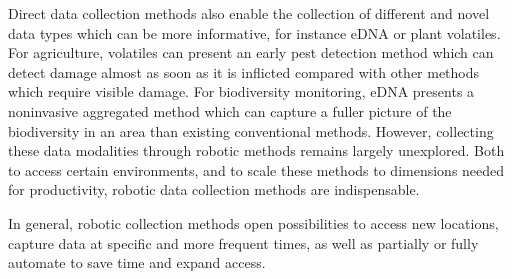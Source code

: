 
Direct data collection methods also enable the collection of different and novel data types which can be more informative, for instance eDNA or plant volatiles.
For agriculture, volatiles can present an early pest detection method which can detect damage almost as soon as it is inflicted compared with other methods which require visible damage. For biodiversity monitoring, eDNA presents a noninvasive aggregated method which can capture a fuller picture of the biodiversity in an area than existing conventional methods.
However, collecting these data modalities through robotic methods remains largely unexplored. Both to access certain environments, and to scale these methods to dimensions needed for productivity, robotic data collection methods are indispensable. 



In general, robotic collection methods open possibilities to access new locations, capture data at specific and more frequent times, as well as partially or fully automate to save time and expand access.



